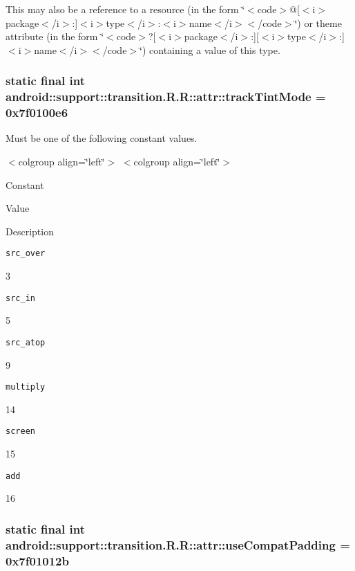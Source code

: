 This may also be a reference to a resource (in the form \char`\"{}$<$code$>$@\mbox{[}$<$i$>$package$<$/i$>$:\mbox{]}$<$i$>$type$<$/i$>$:$<$i$>$name$<$/i$>$$<$/code$>$\char`\"{}) or theme attribute (in the form \char`\"{}$<$code$>$?\mbox{[}$<$i$>$package$<$/i$>$:\mbox{]}\mbox{[}$<$i$>$type$<$/i$>$:\mbox{]}$<$i$>$name$<$/i$>$$<$/code$>$\char`\"{}) containing a value of this type. \hypertarget{classandroid_1_1support_1_1transition_1_1_r_1_1attr_565d29e820a3c155b5f14ff2cadffb77}{
\subsubsection[{trackTintMode}]{\setlength{\rightskip}{0pt plus 5cm}static final int android::support::transition.R.R::attr::trackTintMode = 0x7f0100e6}}
\label{classandroid_1_1support_1_1transition_1_1_r_1_1attr_565d29e820a3c155b5f14ff2cadffb77}


Must be one of the following constant values. \begin{TabularC}{0}
\hline
\end{TabularC}
$<$colgroup align=\char`\"{}left\char`\"{}$>$ $<$colgroup align=\char`\"{}left\char`\"{}$>$ 

Constant

Value

Description 

{\tt src\_\-over}

3

{\tt src\_\-in}

5

{\tt src\_\-atop}

9

{\tt multiply}

14

{\tt screen}

15

{\tt add}

16\hypertarget{classandroid_1_1support_1_1transition_1_1_r_1_1attr_04888ddecc94427374c178d67844846a}{
\subsubsection[{useCompatPadding}]{\setlength{\rightskip}{0pt plus 5cm}static final int android::support::transition.R.R::attr::useCompatPadding = 0x7f01012b}}
\label{classandroid_1_1support_1_1transition_1_1_r_1_1attr_04888ddecc94427374c178d67844846a}


